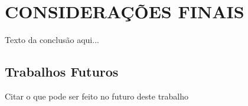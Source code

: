\chapter{\uppercase{Considerações finais}}
\label{conclusao}

Texto da conclusão aqui...


 \section{Trabalhos Futuros}
  
Citar o que pode ser feito no futuro deste trabalho